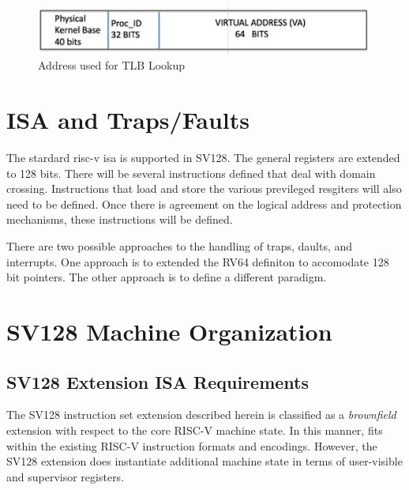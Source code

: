 \documentclass{article}
\begin{document}
\begin{figure}
\includegraphics [scale = .7]
{figures/figure12_address_tlb_lookup.jpg}
\caption{Address used for TLB Lookup}
\end{figure}

\section{ISA and Traps/Faults}

The stardard risc-v isa is supported in SV128.  The  general registers are extended to 128 bits. There will be several instructions defined that deal with domain crossing.  Instructions that load and store the various previleged resgiters will also  need to be defined.  Once there is agreement on the logical address and  protection mechanisms,  these instructions will be defined.

There are two possible approaches to the handling of traps, daults,  and interrupts.  One approach is to extended the RV64 definiton to  accomodate 128 bit pointers.  The other approach is to define a  different paradigm.











\clearpage
\section{SV128 Machine Organization}
\label{sec:SV128MachineOrganization}

\subsection{SV128 Extension ISA Requirements}

The SV128 instruction set extension described herein is classified 
as a \textit{brownfield} extension with respect to the core RISC-V 
machine state.  In this manner, fits within the existing RISC-V instruction 
formats and encodings.  However, the SV128 extension does instantiate 
additional machine state in terms of user-visible and supervisor registers.
\end{document}
